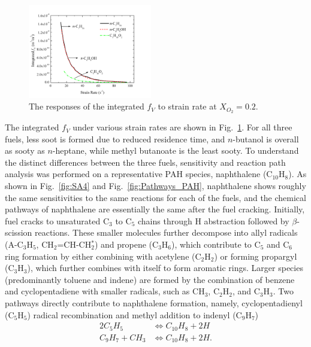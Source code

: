\documentclass[review,3p,times]{elsarticleUS}
\begin{document}
\begin{figure}[ht]
  \centering
  \scriptsize
  \vspace{0.1in}
  \includegraphics[trim=4mm 8mm 30mm 20mm, clip=true, width=0.48\textwidth]{SV-SR.png}
  \normalsize
  \caption{The responses of the integrated $f_V$ to strain rate at $X_{O_2}=0.2$.}
  \label{fig:fv}
\end{figure}

The integrated $f_V$ under various strain rates are shown in Fig.~\ref{fig:fv}. For all three fuels, less soot is formed due to reduced residence time, and $n$-butanol is overall as sooty as $n$-heptane, while methyl butanoate is the least sooty. To understand the distinct differences between the three fuels, sensitivity and reaction path analysis was performed on a representative PAH species, naphthalene (C$_{10}$H$_8$). As shown in Fig.~\ref{fig:SA4} and Fig.~\ref{fig:Pathways_PAH}, naphthalene shows roughly the same sensitivities to the same reactions for each of the fuels, and the chemical pathways of naphthalene are essentially the same after the fuel cracking. Initially, fuel cracks to unsaturated C$_3$ to C$_5$ chains through H abstraction followed by $\beta$-scission reactions. These smaller molecules further decompose into allyl radicals (A-C$_3$H$_5$, CH$_2$=CH-CH$_2^*$) and propene (C$_3$H$_6$), which contribute to C$_5$ and C$_6$ ring formation by either combining with acetylene (C$_2$H$_2$) or forming propargyl (C$_3$H$_3$), which further combines with itself to form aromatic rings. Larger species (predominantly toluene and indene) are formed by the combination of benzene and cyclopentadiene with smaller radicals, such as CH$_3$, C$_2$H$_2$, and C$_3$H$_3$. Two pathways directly contribute to naphthalene formation, namely, cyclopentadienyl (C$_5$H$_5$) radical recombination and methyl addition to indenyl (C$_9$H$_7$)
\begin{align*}
  2 C_5H_5 &\Longleftrightarrow C_{10}H_8 + 2 H\\
  C_9H_7 + CH_3 &\Longleftrightarrow C_{10}H_8 + 2 H.
\end{align*}
\end{document}
